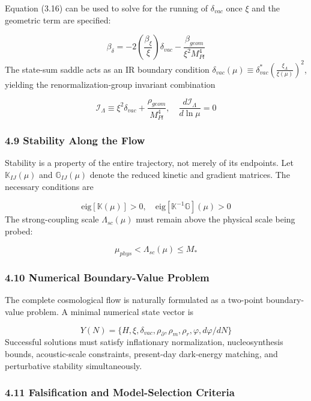 \documentclass[aps,prd,onecolumn,superscriptaddress,nofootinbib,longbibliography,10pt]{revtex4-2}
\begin{document}
  Equation (3.16) can be used to solve for the running of \(\delta_{vac}\) once \(\xi\) and the geometric term are specified:


  \[ \beta_\delta = -2\left(\frac{\beta_\xi}{\xi}\right)\delta_{vac} - \frac{\beta_{geom}}{\xi^2 M_{Pl}^4} \]
  The state-sum saddle acts as an IR boundary condition \(\delta_{vac}(\mu) \equiv \delta_{vac}^* \left( \frac{\xi_\Lambda}{\xi(\mu)} \right)^2\), yielding the renormalization-group invariant combination


  \[ \mathcal{I}_\Lambda \equiv \xi^2 \delta_{vac} + \frac{\rho_{geom}}{M_{Pl}^4}, \quad \frac{d\mathcal{I}_\Lambda}{d\ln\mu} = 0 \]

  
\subsubsection*{4.9 Stability Along the Flow}

  Stability is a property of the entire trajectory, not merely of its endpoints. Let \(\mathbb{K}_{IJ}(\mu)\) and \(\mathbb{G}_{IJ}(\mu)\) denote the reduced kinetic and gradient matrices. The necessary conditions are


  \[ \text{eig}[\mathbb{K}(\mu)] > 0, \quad \text{eig}[\mathbb{K}^{-1}\mathbb{G}](\mu) > 0 \]
  The strong-coupling scale \(\Lambda_{sc}(\mu)\) must remain above the physical scale being probed:


  \[ \mu_{phys} < \Lambda_{sc}(\mu) \le M_* \]

  
\subsubsection*{4.10 Numerical Boundary-Value Problem}

  The complete cosmological flow is naturally formulated as a two-point boundary-value problem. A minimal numerical state vector is


  \[ Y(N) = \{H, \xi, \delta_{vac}, \rho_\partial, \rho_m, \rho_r, \varphi, d\varphi/dN\} \]
  Successful solutions must satisfy inflationary normalization, nucleosynthesis bounds, acoustic-scale constraints, present-day dark-energy matching, and perturbative stability simultaneously.



  
\subsubsection*{4.11 Falsification and Model-Selection Criteria}
\end{document}
